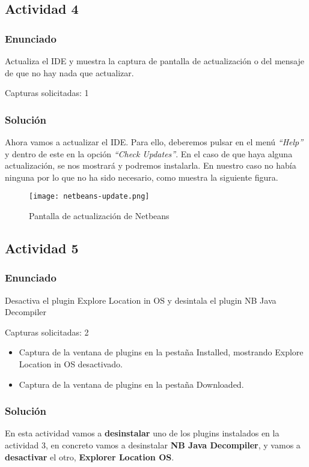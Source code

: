 \subsection{Actividad 4}
\subsubsection{Enunciado}
Actualiza el IDE y muestra la captura de pantalla de actualización o del mensaje de que no hay nada que actualizar.

Capturas solicitadas: 1

\subsubsection{Solución}
Ahora vamos a actualizar el IDE. Para ello, deberemos pulsar en el menú \textit{``Help''} y dentro de este en la opción \textit{``Check Updates''}. En el caso de que haya alguna actualización, se nos mostrará y podremos instalarla. En nuestro caso no había ninguna por lo que no ha sido necesario, como muestra la siguiente figura.

   \begin{figure}[H]
       \centering
        \texttt{[image: netbeans-update.png]}
        \caption{Pantalla de actualización de Netbeans}
    \end{figure}

\subsection{Actividad 5}
\subsubsection{Enunciado}
Desactiva el plugin Explore Location in OS y desintala el plugin NB Java Decompiler

Capturas solicitadas: 2
\begin{itemize}
    \item Captura de la ventana de plugins en la pestaña Installed, mostrando Explore Location in OS desactivado.
    \item Captura de la ventana de plugins en la pestaña Downloaded.
\end{itemize}

\subsubsection{Solución}
En esta actividad vamos a \textbf{desinstalar} uno de los plugins instalados en la actividad 3, en concreto vamos a desinstalar \textbf{NB Java Decompiler}, y vamos a \textbf{desactivar} el otro, \textbf{Explorer Location OS}.


